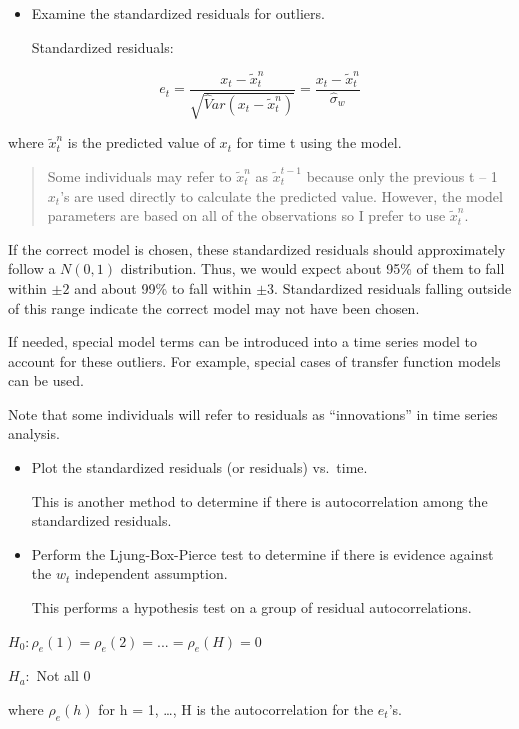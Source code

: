 \documentclass[
]{book}
\theoremstyle{definition}
\theoremstyle{definition}
\theoremstyle{definition}
\theoremstyle{definition}
\theoremstyle{remark}
\begin{document}
\begin{itemize}
\item
  Examine the standardized residuals for outliers.

  Standardized residuals:
\end{itemize}

\[e_t=\frac{x_t-\tilde x^n_t}{\sqrt{\hat Var(x_t-\tilde x^n_t)}}=\frac{x_t-\tilde x^n_t}{\hat \sigma_w}\]

where \(\tilde x^n_t\) is the predicted value of \(x_t\) for time t using the model.

\begin{quote}
Some individuals may refer to \(\tilde x^n_t\) as \(\tilde x^{t-1}_t\) because only the previous t -- 1 \(x_t\)'s are used directly to calculate the predicted value. However, the model parameters are based on all of the observations so I prefer to use \(\tilde x^n_t\).
\end{quote}

If the correct model is chosen, these standardized residuals should approximately follow a \(N(0,1)\) distribution. Thus, we would expect about 95\% of them to fall within \(\pm 2\) and about 99\% to fall within \(\pm 3\). Standardized residuals falling outside of this range indicate the correct model may not have been chosen.

If needed, special model terms can be introduced into a time series model to account for these outliers. For example, special cases of transfer function models can be used.

Note that some individuals will refer to residuals as ``innovations'' in time series analysis.

\begin{itemize}
\item
  Plot the standardized residuals (or residuals) vs.~time.

  This is another method to determine if there is autocorrelation among the standardized residuals.
\item
  Perform the Ljung-Box-Pierce test to determine if there is evidence against the \(w_t\) independent assumption.

  This performs a hypothesis test on a group of residual autocorrelations.
\end{itemize}

\(H_0: \rho_e(1)=\rho_e(2)=...=\rho_e(H)=0\)

\(H_a:\) Not all 0

where \(\rho_e(h)\) for h = 1, \ldots, H is the autocorrelation for the \(e_t\)'s.
\end{document}
